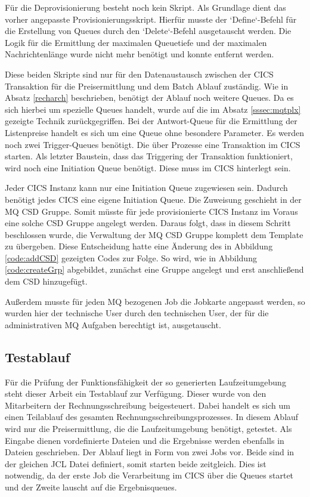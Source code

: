 Für die Deprovisionierung besteht noch kein Skript.
Als Grundlage dient das vorher angepasste Provisionierungsskript.
Hierfür musste der `Define`-Befehl für die Erstellung von Queues durch den `Delete`-Befehl ausgetauscht werden.
Die Logik für die Ermittlung der maximalen Queuetiefe und der maximalen Nachrichtenlänge wurde nicht mehr benötigt und konnte entfernt werden.

Diese beiden Skripte sind nur für den Datenaustausch zwischen der CICS Transaktion für die Preisermittlung und dem Batch Ablauf zuständig.
Wie in Absatz \ref{recharch} beschrieben, benötigt der Ablauf noch weitere Queues.
Da es sich hierbei um spezielle Queues handelt, wurde auf die im Absatz \ref{sssec:mqtplx} gezeigte Technik zurückgegriffen.
Bei der Antwort-Queue für die Ermittlung der Listenpreise handelt es sich um eine Queue ohne besondere Parameter.
Es werden noch zwei Trigger-Queues benötigt.
Die über Prozesse eine Transaktion im CICS starten.
Als letzter Baustein, dass das Triggering der Transaktion funktioniert, wird noch eine Initiation Queue benötigt.
Diese muss im CICS hinterlegt sein.

Jeder CICS Instanz kann nur eine Initiation Queue zugewiesen sein.
Dadurch benötigt jedes CICS eine eigene Initiation Queue.
Die Zuweisung geschieht in der MQ CSD Gruppe.
Somit müsste für jede provisionierte CICS Instanz im Voraus eine solche CSD Gruppe angelegt werden.
Daraus folgt, dass in diesem Schritt beschlossen wurde, die Verwaltung der MQ CSD Gruppe komplett dem Template zu übergeben.
Diese Entscheidung hatte eine Änderung des in Abbildung \ref{code:addCSD} gezeigten Codes zur Folge.
So wird, wie in Abbildung \ref{code:createGrp} abgebildet, zunächst eine Gruppe angelegt und erst anschließend dem CSD hinzugefügt.

Außerdem musste für jeden MQ bezogenen Job die Jobkarte angepasst werden, so wurden hier der technische User durch den technischen User, der für die administrativen MQ Aufgaben berechtigt ist, ausgetauscht.

\subsection{Testablauf}
Für die Prüfung der Funktionsfähigkeit der so generierten Laufzeitumgebung steht dieser Arbeit ein Testablauf zur Verfügung.
Dieser wurde von den Mitarbeitern der Rechnungsschreibung beigesteuert.
Dabei handelt es sich um einen Teilablauf des gesamten Rechnungsschreibungsprozesses.
In diesem Ablauf wird nur die Preisermittlung, die die Laufzeitumgebung benötigt, getestet.
Als Eingabe dienen vordefinierte Dateien und die Ergebnisse werden ebenfalls in Dateien geschrieben.
Der Ablauf liegt in Form von zwei Jobs vor.
Beide sind in der gleichen JCL Datei definiert, somit starten beide zeitgleich.
Dies ist notwendig, da der erste Job die Verarbeitung im CICS über die Queues startet und der Zweite lauscht auf die Ergebnisqueues.

